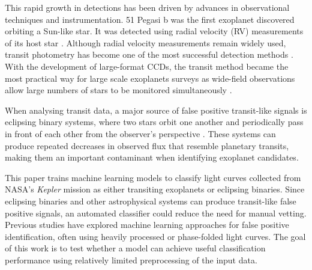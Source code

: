 This rapid growth in detections has been driven by advances in observational techniques and instrumentation. 51 Pegasi b was the first exoplanet discovered orbiting a Sun-like star. It was detected using radial velocity (RV) measurements of its host star \citep{First_Exoplanet_RV}. Although radial velocity measurements remain widely used, transit photometry has become one of the most successful detection methods \citep{How_Many_Transits}. With the development of large-format CCDs, the transit method became the most practical way for large scale exoplanets surveys as wide-field observations allow large numbers of stars to be monitored simultaneously \citep{2005MNRAS.360..703H}.

When analysing transit data, a major source of false positive transit-like signals is eclipsing binary systems, where two stars orbit one another and periodically pass in front of each other from the observer's perspective \citep{2018ApJS..235...38T, Morton_2016}. These systems can produce repeated decreases in observed flux that resemble planetary transits, making them an important contaminant when identifying exoplanet candidates.

This paper trains machine learning models to classify light curves collected from NASA's \textit{Kepler} mission as either transiting exoplanets or eclipsing binaries. Since eclipsing binaries and other astrophysical systems can produce transit-like false positive signals, an automated classifier could reduce the need for manual vetting. Previous studies have explored machine learning approaches for false positive identification, often using heavily processed or phase-folded light curves. The goal of this work is to test whether a model can achieve useful classification performance using relatively limited preprocessing of the input data.

